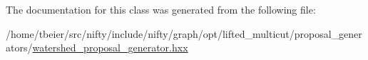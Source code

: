 The documentation for this class was generated from the following file\+:\begin{DoxyCompactItemize}
\item 
/home/tbeier/src/nifty/include/nifty/graph/opt/lifted\+\_\+multicut/proposal\+\_\+generators/\hyperlink{lifted__multicut_2proposal__generators_2watershed__proposal__generator_8hxx}{watershed\+\_\+proposal\+\_\+generator.\+hxx}\end{DoxyCompactItemize}
